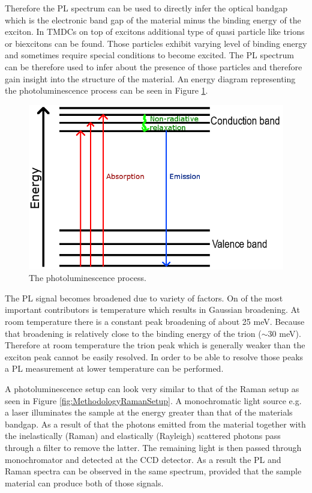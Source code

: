 Therefore the PL spectrum can be used to directly infer the optical bandgap which is the electronic band gap of the material minus the binding energy of the exciton. In TMDCs on top of excitons additional type of quasi particle like trions or biexcitons can be found. Those particles exhibit varying level of binding energy and sometimes require special conditions to become excited. The PL spectrum can be therefore used to infer about the presence of those particles and therefore gain insight into the structure of the material. An energy diagram representing the photoluminescence process can be seen in Figure \ref{fig:MethodologyPLDiagram}.

\begin{figure}[H]
	\begin{center}
		\includegraphics[scale=0.5]{Methodology/PLDiagram.png}
		\caption{The photoluminescence process.}
		\label{fig:MethodologyPLDiagram}
	\end{center}
\end{figure}

The PL signal becomes broadened due to variety of factors. On of the most important contributors is temperature which results in Gaussian broadening. At room temperature there is a constant peak broadening of about 25 meV. Because that broadening is relatively close to the binding energy of the trion ($\sim$30 meV). Therefore at room temperature the trion peak which is generally weaker than the exciton peak cannot be easily resolved. In order to be able to resolve those peaks a PL measurement at lower temperature can be performed.

A photoluminescence setup can look very similar to that of the Raman setup as seen in Figure \ref{fig:MethodologyRamanSetup}. A monochromatic light source e.g. a laser illuminates the sample at the energy greater than that of the materials bandgap. As a result of that the photons emitted from the material together with the inelastically (Raman) and elastically (Rayleigh) scattered photons pass through a filter to remove the latter. The remaining light is then passed through monochromator and detected at the CCD detector. As a result the PL and Raman spectra can be observed in the same spectrum, provided that the sample material can produce both of those signals. 


